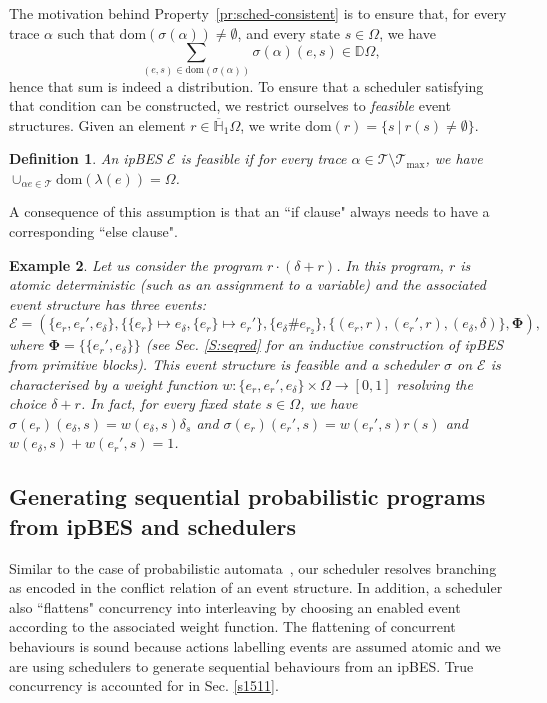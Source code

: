 \documentclass[review]{elsart}
\newtheorem{definition}{Definition}[section]
\newtheorem{example}[definition]{Example}
\newcommand{\D}{\mathbb{D}}
\newcommand{\Hip}{\overline{\mathbb{H}}_1}
\newcommand{\dom}{\mathrm{dom}}
\newcommand{\EE}{\mathcal{E}}
\newcommand{\TT}{\mathcal{T}}
\newcommand{\exit}{\mathbf{\Phi}}
\newcommand{\unity}{\delta}
\newcommand{\Sec}[1]{Sec. \ref{#1}}
\begin{document}
The motivation behind Property~\ref{pr:sched-consistent} is to ensure that, for every trace $\alpha$ such that $\dom(\sigma(\alpha)){\neq}\emptyset$, and every state $s{\in}\Omega$, we have
\[
	\sum_{(e,s){\in} \dom(\sigma(\alpha))} \sigma(\alpha)(e,s) {\in}\D\Omega,
\]
hence that sum is indeed a distribution. To ensure that a scheduler satisfying that condition can be constructed, we restrict ourselves to \textit{feasible} event structures. Given an element $r{\in}\Hip\Omega$, we write $\dom(r) {=} \{s \ |\ r(s){\neq}\emptyset\}$.

\begin{definition}
An ipBES $\EE$ is \emph{feasible} if for every trace $\alpha {\in}\TT{\setminus}\TT_{\max}$, we have ${\cup}_{\alpha e{\in}\TT}\dom(\lambda(e)) {=} \Omega$.
\end{definition}

A consequence of this assumption is that an ``if clause" always needs to have a corresponding ``else clause".

\begin{example}
Let us consider the program $r{\cdot}(\unity{+}r)$. In this program, $r$ is  atomic deterministic (such as an assignment to a variable) and the associated event structure has three events:
\[
	\EE = (\{e_{r},e_{r}',e_\delta\},\{\{e_{r}\}{\mapsto} e_\delta,\{e_{r}\}{\mapsto} e_{r}'\},\{e_\delta\#e_{r_2}\},\{(e_r,r),(e_r',r),(e_\delta,\delta)\},\exit),
\]
where $\exit = \{\{e_r',e_\delta\}\}$ (see \Sec{S:seqred} for an inductive construction of ipBES from primitive blocks). This event structure is feasible and a scheduler $\sigma$ on $\EE$ is characterised by a weight function $w{:}\{e_r,e_r',e_\delta\}{\times}\Omega{\to}[0,1]$ resolving the choice $\unity {+} r$.  In fact, for every fixed state $s{\in}\Omega$, we have $\sigma(e_r)(e_\delta,s){=}w(e_\delta,s)\delta_s$ and $\sigma(e_r)(e_r',s){=}w(e_r',s)r(s)$ and $w(e_\delta,s) {+} w(e_r',s) {=} 1$.
\end{example}


\subsection{Generating sequential probabilistic programs from ipBES and schedulers}

Similar to the case of probabilistic automata~\cite{Seg94}, our scheduler resolves branching as encoded in the conflict relation of an event structure. In addition, a scheduler also ``flattens" concurrency into interleaving by choosing an enabled event according to the associated weight function. The flattening of concurrent behaviours is sound because actions labelling events are assumed atomic and we are using schedulers to generate sequential behaviours from an ipBES. True concurrency is accounted for in \Sec{s1511}.
\end{document}
